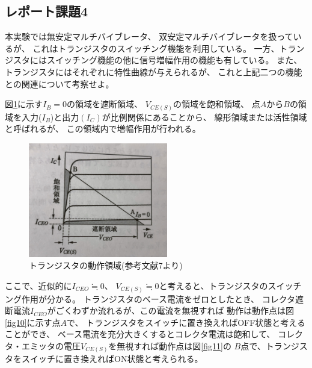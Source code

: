 \documentclass[12pt]{jarticle}
\begin{document}
\subsection{レポート課題4}
\begin{shadebox}
    本実験では無安定マルチバイブレータ、
    双安定マルチバイブレータを扱っているが、
    これはトランジスタのスイッチング機能を利用している。
    一方、トランジスタにはスイッチング機能の他に信号増幅作用の機能も有している。
    また、トランジスタにはそれぞれに特性曲線が与えられるが、
    これと上記二つの機能との関連について考察せよ。
\end{shadebox}
図\ref{fig9}に示す$I_B=0$の領域を遮断領域、
$V_{CE(S)}$の領域を飽和領域、
点$A$から$B$の領域を入力($I_B$)と出力$(I_C)$が比例関係にあることから、
線形領域または活性領域と呼ばれるが、
この領域内で増幅作用が行われる。
\begin{figure}[h]
    \begin{center}
        \includegraphics[bb=0 0 2589 2128,height=5cm]{parusu_9.jpg}
    \end{center}
    \caption{トランジスタの動作領域(参考文献7より)}
    \label{fig9}
\end{figure}

ここで、近似的に$I_{CEO} \fallingdotseq 0$、
$V_{CE(S)} \fallingdotseq 0$と考えると、トランジスタのスイッチング作用が分かる。
トランジスタのベース電流をゼロとしたとき、
コレクタ遮断電流$I_{CEO}$がごくわずか流れるが、この電流を無視すれば
動作は動作点は図\ref{fig10}に示す点$A$で、
トランジスタをスイッチに置き換えればOFF状態と考えることができ、
ベース電流を充分大きくするとコレクタ電流は飽和して、
コレクタ・エミッタの電圧$V_{CE(S)}$を無視すれば動作点は図\ref{fig11}の
$B$点で、トランジスタをスイッチに置き換えればON状態と考えられる。
\end{document}
